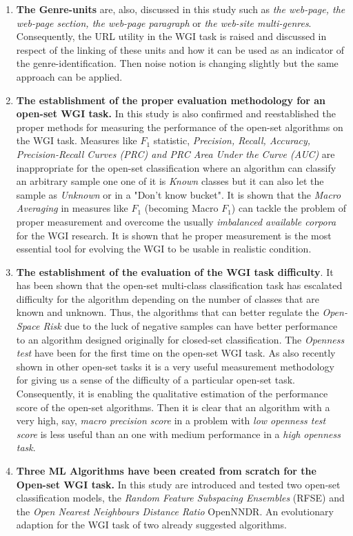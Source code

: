 \begin{enumerate}
\item \textbf{The Genre-units} are, also, discussed in this study such as \textit{the web-page, the web-page section, the web-page paragraph} or \textit{the web-site multi-genres}. Consequently, the URL utility in the WGI task is raised and discussed in respect of the linking of these units and how it can be used as an indicator of the genre-identification. Then noise notion is changing slightly but the same approach can be applied.
\item \textbf{The establishment of the proper evaluation methodology for an open-set WGI task.} In this study is also confirmed and reestablished the proper methods for measuring the performance of the open-set algorithms on the WGI task. Measures like $F_{1}$ statistic, \textit{Precision, Recall, Accuracy, Precision-Recall Curves (PRC) and PRC Area Under the Curve (AUC)} are inappropriate for the open-set classification where an algorithm can classify an arbitrary sample one one of it is \textit{Known} classes but it can also let the sample as \textit{Unknown} or in a "Don't know bucket". It is shown that the \textit{Macro Averaging} in measures like $F_{1}$ (becoming Macro $F_{1}$) can tackle the problem of proper measurement and overcome the usually \textit{imbalanced available corpora} for the WGI research. It is shown that he proper measurement is the most essential tool for evolving the WGI to be usable in realistic condition.
\item \textbf{The establishment of the evaluation of the WGI task difficulty}. It has been shown that the open-set multi-class classification task has escalated difficulty for the algorithm depending on the number of classes that are known and unknown. Thus, the algorithms that can better regulate the \textit{Open-Space Risk} due to the luck of negative samples can have better performance to an algorithm designed originally for closed-set classification. The \textit{Openness test} have been for the first time on the open-set WGI task. As also recently shown in other open-set tasks it is a very useful measurement methodology for giving us a sense of the difficulty of a particular open-set task. Consequently, it is enabling the qualitative estimation of the performance score of the open-set algorithms. Then it is clear that an algorithm with a very high, say, \textit{macro precision score} in a problem with \textit{low openness test score} is less useful than an one with medium performance in a \textit{high openness task}.
\item \textbf{Three ML Algorithms have been created from scratch for the Open-set WGI task.} In this study are introduced and tested two open-set classification models, the \textit{Random Feature Subspacing Ensembles} (RFSE) and the \textit{Open Nearest Neighbours Distance Ratio} OpenNNDR. An evolutionary adaption for the WGI task of two already suggested algorithms. 

\end{enumerate}
